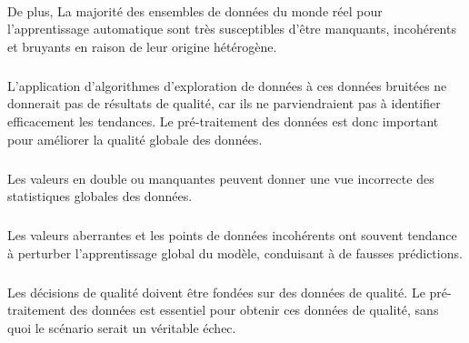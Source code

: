 \documentclass[a4paper, 12pt]{article}
\begin{document}
	\paragraph{}De plus, La majorité des ensembles de données du monde réel pour l’apprentissage automatique sont très susceptibles d’être manquants, incohérents et bruyants en raison de leur origine hétérogène. 
	\subparagraph{}L'application d'algorithmes d'exploration de données à ces données bruitées ne donnerait pas de résultats de qualité, car ils ne parviendraient pas à identifier efficacement les tendances. Le pré-traitement des données est donc important pour améliorer la qualité globale des données.
	\subparagraph{}Les valeurs en double ou manquantes peuvent donner une vue incorrecte des statistiques globales des données.
	\subparagraph{}Les valeurs aberrantes et les points de données incohérents ont souvent tendance à perturber l’apprentissage global du modèle, conduisant à de fausses prédictions.
	\subparagraph{}Les décisions de qualité doivent être fondées sur des données de qualité. Le pré-traitement des données est essentiel pour obtenir ces données de qualité, sans quoi le scénario serait un véritable échec.
\end{document}
